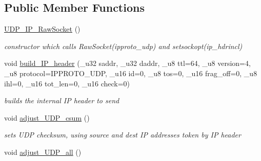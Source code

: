 \subsection*{Public Member Functions}
\begin{CompactItemize}
\item 
\hypertarget{classsocketpp_1_1UDP__IP__RawSocket_90e90d941b64d234c231ca543fe8745a}{
\hyperlink{classsocketpp_1_1UDP__IP__RawSocket_90e90d941b64d234c231ca543fe8745a}{UDP\_\-IP\_\-RawSocket} ()}
\label{classsocketpp_1_1UDP__IP__RawSocket_90e90d941b64d234c231ca543fe8745a}

\begin{CompactList}\small\item\em constructor which calls RawSocket(ipproto\_\-udp) and setsockopt(ip\_\-hdrincl) \item\end{CompactList}\item 
\hypertarget{classsocketpp_1_1UDP__IP__RawSocket_bd80d6a249cfce0ed85dfbd55d901065}{
void \hyperlink{classsocketpp_1_1UDP__IP__RawSocket_bd80d6a249cfce0ed85dfbd55d901065}{build\_\-IP\_\-header} (\_\-u32 saddr, \_\-u32 daddr, \_\-u8 ttl=64, \_\-u8 version=4, \_\-u8 protocol=IPPROTO\_\-UDP, \_\-u16 id=0, \_\-u8 tos=0, \_\-u16 frag\_\-off=0, \_\-u8 ihl=0, \_\-u16 tot\_\-len=0, \_\-u16 check=0)}
\label{classsocketpp_1_1UDP__IP__RawSocket_bd80d6a249cfce0ed85dfbd55d901065}

\begin{CompactList}\small\item\em builds the internal IP header to send \item\end{CompactList}\item 
\hypertarget{classsocketpp_1_1UDP__IP__RawSocket_6c2f6c375cec90f64fd093af37369d6a}{
void \hyperlink{classsocketpp_1_1UDP__IP__RawSocket_6c2f6c375cec90f64fd093af37369d6a}{adjust\_\-UDP\_\-csum} ()}
\label{classsocketpp_1_1UDP__IP__RawSocket_6c2f6c375cec90f64fd093af37369d6a}

\begin{CompactList}\small\item\em sets UDP checksum, using source and dest IP addresses token by IP header \item\end{CompactList}\item 
\hypertarget{classsocketpp_1_1UDP__IP__RawSocket_94bec31d8c856ccdafa083c74b8b7e58}{
void \hyperlink{classsocketpp_1_1UDP__IP__RawSocket_94bec31d8c856ccdafa083c74b8b7e58}{adjust\_\-UDP\_\-all} ()}
\label{classsocketpp_1_1UDP__IP__RawSocket_94bec31d8c856ccdafa083c74b8b7e58}


\end{CompactItemize}
